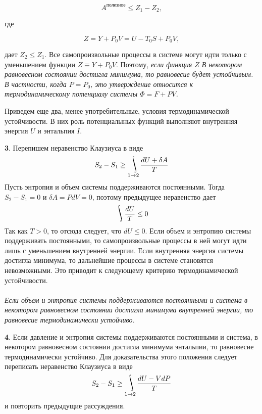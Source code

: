 \documentclass[a4paper,14pt]{article} %
\DeclareMathOperator*{\myint}{\ThisStyle{\rotatebox{25}{$\SavedStyle\!\int\!\!\!$}}}
\begin{document}
\begin{equation*}
A^{\text {полезное}} \leqslant Z_{1}-Z_{2},
\end{equation*}

где 

\begin{equation*}
Z=Y+P_{0} V=U-T_{0} S+P_{0} V,
\end{equation*}

 дает $Z_{2} \leqslant Z_{1} .$ Все самопроизвольные процессы в системе могут идти только с уменьшением функции $Z \equiv Y+P_{0} V .$ Поэтому, \textit{если финкция $Z$ В некотором равновесном состоянии достигла минимума, то равновесие будет устойчивым. В частности, когда $P = P_0$,  это утверждение относится к термодинамическому потенциалу системы $\Phi = F+ P V$.}
 
Приведем еще два, менее употребительные, условия термодинамической устойчивости. В них роль потенциалыных функций выполняют внутренняя энергия $U$ и энтальпия $I$.

\textbf{3}. Перепишем неравенство Клаузиуса в виде
\[S_2 - S_1 \geq \myint_{1\rightarrow 2}{\frac{dU + \delta A}{T}}\]
Пусть энтропия и объем системы поддерживаются постоянными. Тогда $S_2 - S_1 = 0$ и $\delta A = PdV = 0$, поэтому предыдущее неравенство дает 
\[\myint{\frac{dU}{T}} \leq 0\]
Так как $T > 0$, то отсюда следует, что $dU \leq 0$. Если объем и
энтропию системы поддерживать постоянными, то самопроизвольные процессы в ней могут идти лишь с уменьшением внутренней
энергии. Если внутренняя энергия системы достигла минимума, то
дальнейшие процессы в системе становятся невозможными. Это
приводит к следующему критерию термодинамической устойчивости.\\\\
\textit{Если объем и энтропия системы поддерживаются постоянными
и система в некотором равновесном состоянии достигла минимума
внутренней энергии, то равновесие термодинамически устойчиво.} 

\textbf{4}. Если давление и энтропия системы поддерживаются постоянными и система, в некотором равновесном состоянии достигла минимума энтальпии, то равновесие термодинамически устойчиво.
Для доказательства этого положения следует переписать неравенство Клаузиуса в виде 
\[S_2 - S_1 \geq \myint_{1\rightarrow 2}{\frac{dU - VdP}{T}}\]
и повторить предыдущие рассуждения.
\end{document}
